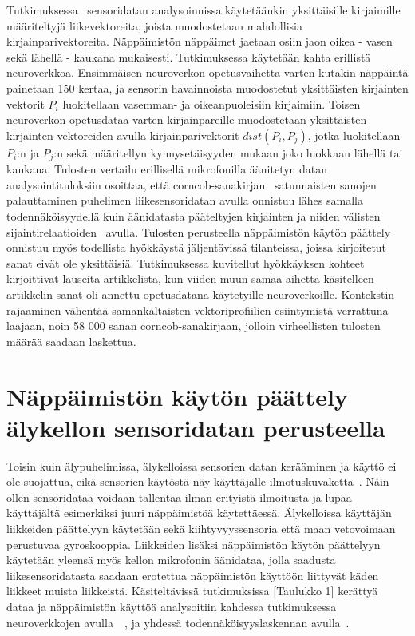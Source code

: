 \documentclass[finnish]{tktltiki2}
\theoremstyle{definition}
\theoremstyle{remark}
\begin{document}
Tutkimuksessa~\cite{mar} sensoridatan analysoinnissa käytetäänkin yksittäisille kirjaimille määriteltyjä liikevektoreita, joista muodostetaan mahdollisia kirjainparivektoreita. Näppäimistön näppäimet jaetaan osiin jaon oikea - vasen sekä lähellä - kaukana mukaisesti. Tutkimuksessa käytetään kahta erillistä neuroverkkoa. Ensimmäisen neuroverkon opetusvaihetta varten kutakin näppäintä painetaan 150 kertaa, ja sensorin havainnoista muodostetut yksittäisten kirjainten vektorit $P_i$ luokitellaan vasemman- ja oikeanpuoleisiin kirjaimiin. Toisen neuroverkon opetusdataa varten kirjainpareille muodostetaan yksittäisten kirjainten vektoreiden avulla kirjainparivektorit $dist(P_i,P_j)$, jotka luokitellaan $P_i$:n ja $P_j$:n sekä määritellyn kynnysetäisyyden mukaan joko luokkaan lähellä tai kaukana. Tulosten vertailu erillisellä mikrofonilla äänitetyn datan analysointituloksiin osoittaa, että corncob-sanakirjan~\cite{corn} satunnaisten sanojen palauttaminen puhelimen liikesensoridatan avulla onnistuu lähes samalla todennäköisyydellä kuin äänidatasta pääteltyjen kirjainten ja niiden välisten sijaintirelaatioiden~\cite{berger} avulla. Tulosten perusteella näppäimistön käytön päättely onnistuu myös todellista hyökkäystä jäljentävissä tilanteissa, joissa kirjoitetut sanat eivät ole yksittäisiä. Tutkimuksessa kuvitellut hyökkäyksen kohteet kirjoittivat lauseita artikkelista, kun viiden muun samaa aihetta käsitelleen artikkelin sanat oli annettu opetusdatana käytetyille neuroverkoille. Kontekstin rajaaminen vähentää samankaltaisten vektoriprofiilien esiintymistä verrattuna laajaan, noin 58 000 sanan corncob-sanakirjaan, jolloin virheellisten tulosten määrää saadaan laskettua.
 

\section{Näppäimistön käytön päättely älykellon sensoridatan perusteella}
Toisin kuin älypuhelimissa, älykelloissa sensorien datan kerääminen ja käyttö ei ole suojattua, eikä sensorien käytöstä näy käyttäjälle ilmotuskuvaketta~\cite{liu}. Näin ollen sensoridataa voidaan tallentaa ilman erityistä ilmoitusta ja lupaa käyttäjältä esimerkiksi juuri näppäimistöä käytettäessä.
Älykelloissa käyttäjän liikkeiden päättelyyn käytetään sekä kiihtyvyyssensoria että maan vetovoimaan perustuvaa gyroskooppia. Liikkeiden lisäksi näppäimistön käytön päättelyyn käytetään yleensä myös kellon mikrofonin äänidataa, jolla saadusta liikesensoridatasta saadaan erotettua näppäimistön käyttöön liittyvät käden liikkeet muista liikkeistä. Käsiteltävissä tutkimuksissa [Taulukko 1] kerättyä dataa ja näppäimistön käyttöä analysoitiin kahdessa tutkimuksessa neuroverkkojen avulla~\cite{maiti}~\cite{liu}, ja yhdessä todennäköisyyslaskennan avulla~\cite{mole}.
\end{document}
